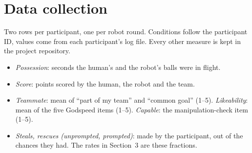 \section{Data collection}
\label{app:data}
Two rows per participant, one per robot round. Conditions follow the participant ID, values come from each participant's log file. Every other measure is kept in the project repository.
\begin{itemize}[nosep]
    \item \textit{Possession}: seconds the human's and the robot's balls were in flight.
    \item \textit{Score}: points scored by the human, the robot and the team.
    \item \textit{Teammate}: mean of ``part of my team'' and ``common goal'' (1--5). \textit{Likeability}: mean of the five Godspeed items (1--5). \textit{Capable}: the manipulation-check item (1--5).
    \item \textit{Steals, rescues (unprompted, prompted)}: made by the participant, out of the chances they had. The rates in Section~3 are these fractions.
\end{itemize}

